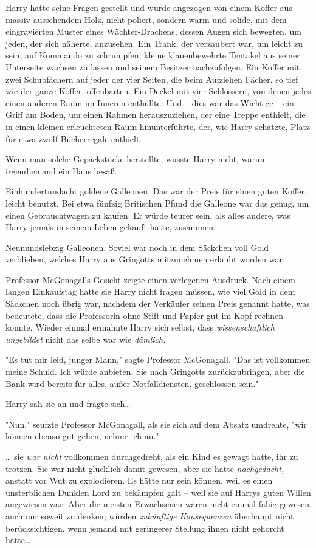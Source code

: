 {Harry hatte seine Fragen gestellt und wurde angezogen von einem Koffer aus massiv aussehendem Holz, nicht poliert, sondern warm und solide, mit dem eingravierten Muster eines Wächter-Drachens, dessen Augen sich bewegten, um jeden, der sich näherte, anzusehen. Ein Trank, der verzaubert war, um leicht zu sein, auf Kommando zu schrumpfen, kleine klauenbewehrte Tentakel aus seiner Unterseite wachsen zu lassen und seinem Besitzer nachzufolgen. Ein Koffer mit zwei Schubfächern auf jeder der vier Seiten, die beim Aufziehen Fächer, so tief wie der ganze Koffer, offenbarten. Ein Deckel mit vier Schlössern, von denen jedes einen anderen Raum im Inneren enthüllte. Und -- dies war das Wichtige -- ein Griff am Boden, um einen Rahmen herauszuziehen, der eine Treppe enthielt, die in einen kleinen erleuchteten Raum hinunterführte, der, wie Harry schätzte, Platz für etwa zwölf Bücherregale enthielt.

Wenn man solche Gepäckstücke herstellte, wusste Harry nicht, warum irgendjemand ein Haus besaß.

Einhundertundacht goldene Galleonen. Das war der Preis für einen guten Koffer, leicht benutzt. Bei etwa fünfzig Britischen Pfund die Galleone war das genug, um einen Gebrauchtwagen zu kaufen. Er würde teurer sein, als alles andere, was Harry jemals in seinem Leben gekauft hatte, zusammen.

Neunundsiebzig Galleonen. Soviel war noch in dem Säckchen voll Gold verblieben, welches Harry aus Gringotts mitzunehmen erlaubt worden war.

Professor McGonagalls Gesicht zeigte einen verlegenen Ausdruck. Nach einem langen Einkaufstag hatte sie Harry nicht fragen müssen, wie viel Gold in dem Säckchen noch übrig war, nachdem der Verkäufer seinen Preis genannt hatte, was bedeutete, dass die Professorin ohne Stift und Papier gut im Kopf rechnen konnte. Wieder einmal ermahnte Harry sich selbst, dass \emph{wissenschaftlich ungebildet} nicht das selbe war wie \emph{dämlich.}

"Es tut mir leid, junger Mann," sagte Professor McGonagall. "Das ist vollkommen meine Schuld. Ich würde anbieten, Sie nach Gringotts zurückzubringen, aber die Bank wird bereits für alles, außer Notfalldiensten, geschlossen sein."

Harry sah sie an und fragte sich…

"Nun," seufzte Professor McGonagall, als sie sich auf dem Absatz umdrehte, "wir können ebenso gut gehen, nehme ich an."

… sie \emph{war nicht} vollkommen durchgedreht, als ein Kind es gewagt hatte, ihr zu trotzen. Sie war nicht glücklich damit gewesen, aber sie hatte \emph{nachgedacht,} anstatt vor Wut zu explodieren. Es hätte nur sein können, weil es einen unsterblichen Dunklen Lord zu bekämpfen galt -- weil sie auf Harrys guten Willen angewiesen war. Aber die meisten Erwachsenen wären nicht einmal fähig gewesen, auch nur soweit zu denken; würden \emph{zukünftige Konsequenzen} überhaupt nicht berücksichtigen, wenn jemand mit geringerer Stellung ihnen nicht gehorcht hätte…

}

